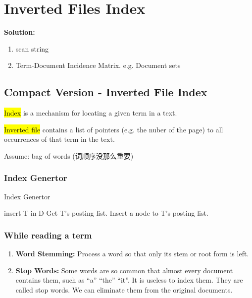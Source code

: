 \newpage
\section{Inverted Files Index}

\textbf{Solution:}
\begin{enumerate}
    \item scan string
    \item Term-Document Incidence Matrix. e.g. Document sets  
\end{enumerate}

\subsection{Compact Version - Inverted File Index}
\begin{definition}
    \hl{Index} is a mechanism for locating a given term in a text. 
\end{definition}
\begin{definition}
    \hl{Inverted file} contains a list of pointers (e.g. the nuber of the page) to all occurrences of that term in the text. 
\end{definition}

Assume: bag of words (词顺序没那么重要)

\subsubsection{Index Genertor}
\begin{algorithm}[H]
    \caption{Index Genertor}
    \begin{algorithmic}
                    \State insert T in D
                \EndIf
                \State Get T's posting list. 
                \State Insert a node to T's posting list. 
            \EndFor
        \EndFor
    \end{algorithmic}
\end{algorithm}

\subsubsection{While reading a term}
\begin{enumerate}
    \item \textbf{Word Stemming:} Process a word so that only its stem or root form is left. 
    \item \textbf{Stop Words:} Some words are so common that almost every document contains them, such as ``a'' ``the'' ``it''.  It is useless to index them.  They are called stop words.  We can eliminate them from the original documents.
\end{enumerate}

